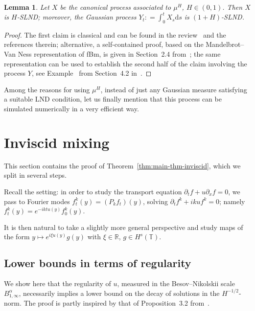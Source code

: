 \documentclass[11pt,oneside,reqno]{amsart}
\newcommand{\mathd}{\mathrm{d}}
\newtheorem{lemma}[theorem]{Lemma}
\numberwithin{equation}{section}
\begin{document}
\begin{lemma}
  \label{lem:fBm-LND}Let $X$ be the canonical process associated to $\mu^H$,
  $H \in (0, 1)$. Then $X$ is $H$-SLND; moreover, the Gaussian process $Y_t :
  = \int_0^t X_s \mathd s$ is $(1 + H)$-SLND.
\end{lemma}

\begin{proof}
  The first claim is classical and can be found in the review~{\cite{xiao}}
  and the references therein; alternative, a self-contained proof, based on
  the Mandelbrot--Van Ness representation of fBm, is given in Section~2.4
  from~{\cite{galeati2020prevalence}}; the same representation can be used to
  establish the second half of the claim involving the process $Y$, see
  Example~ from Section~4.2 in~{\cite{galeati2020prevalence}}.
\end{proof}

Among the reasons for using $\mu^H$, instead of just any Gaussian measure
satisfying a suitable LND condition, let us finally mention that this process
can be simulated numerically in a very efficient way.

\section{Inviscid mixing}\label{sec:inviscid-mixing}

This section contains the proof of Theorem~\ref{thm:main-thm-inviscid}, which
we split in several steps.

Recall the setting: in order to study the transport equation $\partial_t f + u
\partial_x f = 0$, we pass to Fourier modes $f^k_t (y) = (P_k f_t) (y)$,
solving $\partial_t f^k + i k u f^k = 0$; namely $f^k_t (y) = e^{- i k t u
(y)} f^k_0 (y)$.

It is then natural to take a slightly more general perspective and study maps
of the form $y \mapsto e^{i \xi u (y)} g (y)$ with $\xi \in \mathbb{R}$, $g
\in H^s (\mathbb{T})$.

\subsection{Lower bounds in terms of
regularity}\label{sec:lower-bound-inviscid}

We show here that the regularity of $u$, measured in the Besov--Nikolskii
scale $B^{\alpha}_{1, \infty}$, necessarily implies a lower bound on the decay
of solutions in the $H^{- 1 / 2}$-norm. The proof is partly inspired by that
of Proposition~3.2 from~{\cite{colombozelati}}.
\end{document}
